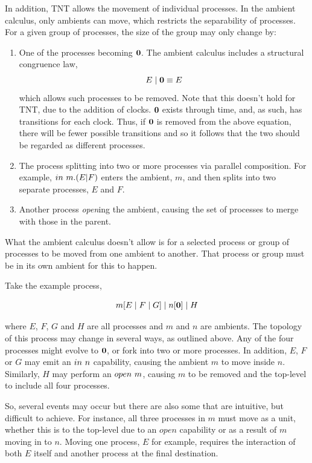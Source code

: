 In addition, TNT allows the movement of individual processes.  In the
ambient calculus, only ambients can move, which restricts the
separability of processes.  For a given group of processes, the
size of the group may only change by:

\begin{enumerate}
\item One of the processes becoming $\textbf{0}$.  The ambient calculus
      includes a structural congruence law,
\begin{equation}
E\;|\;\textbf{0} \equiv E
\end{equation}
      which allows such processes to be removed.  Note that this doesn't
      hold for TNT, due to the addition of clocks.  $\textbf{0}$ exists
      through time, and, as such, has transitions for each clock.  Thus,
      if $\textbf{0}$ is removed from the above equation, there will be fewer
      possible transitions and so it follows that the two should be
      regarded as different processes.
\item The process splitting into two or more processes via parallel
      composition.  For example, $in\ m.(E | F)$ enters the ambient, $m$,
      and then splits into two separate processes, $E$ and $F$.
\item Another process \emph{open}ing the ambient, causing the set of
      processes to merge with those in the parent.
\end{enumerate}

What the ambient calculus doesn't allow is for a selected process or
group of processes to be moved from one ambient to another.  That
process or group must be in its own ambient for this to happen.

Take the example process, 

\begin{equation}
m[E\;|\;F\;|\;G]\;|\;n[\textbf{0}]\;|\;H
\end{equation}

\noindent where $E$, $F$, $G$ and $H$ are all processes and $m$ and $n$
are ambients.  The topology of this process may change in several ways, as
outlined above. Any of the four processes might evolve to $\textbf{0}$, or fork
into two or more processes.  In addition, $E$, $F$ or $G$ may emit an
$in\ n$ capability, causing the ambient $m$ to move inside $n$.
Similarly, $H$ may perform an $open\ m$, causing $m$ to be removed and
the top-level to include all four processes.

So, several events may occur but there are also some that are intuitive,
but difficult to achieve.  For instance, all three processes in $m$ must
move as a unit, whether this is to the top-level due to an $open$
capability or as a result of $m$ moving in to $n$.  Moving one process,
$E$ for example, requires the interaction of both $E$ itself and another
process at the final destination.

